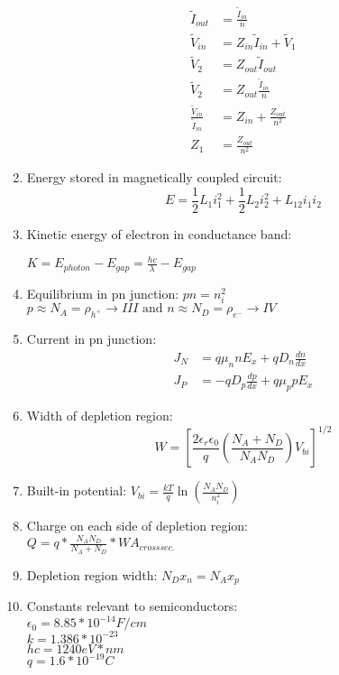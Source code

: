 \documentclass[twocolumn]{article}
\begin{document}
\begin{enumerate}
\begin{align*}
        \tilde{I}_{out} &= \frac{\tilde{I}_{in}}{n} \\
        \tilde{V}_{in} &= Z_{in}\tilde{I}_{in} + \tilde{V}_1 \\
        \tilde{V}_2 &= Z_{out}\tilde{I}_{out} \\
        \tilde{V}_2 &= Z_{out}\frac{\tilde{I}_{in}}{n} \\
        \frac{\tilde{V}_{in}}{\tilde{I}_{in}} &= Z_{in} + \frac{Z_{out}}{n^2}\\
        Z_{1}&=\frac{Z_{out}}{n^2}
    \end{align*}
    \item Energy stored in magnetically coupled circuit: 
    \[E = \frac{1}{2}L_1i_1^2 + \frac{1}{2}L_2i_2^2 + L_{12}i_1i_2\]
    \newpage
    \item Kinetic energy of electron in conductance band:
    \begin{center}
    $K=E_{photon}-E_{gap}=\frac{hc}{\lambda}-E_{gap}$
    \end{center}
    \item Equilibrium in pn junction: $pn = n_i^2$\\ \hspace{1cm}$p\approx N_A = \rho_{h^+}\rightarrow III \text{ and } n\approx N_D = \rho_{e^-} \rightarrow IV$
    \item Current in pn junction: 
    \begin{align*}
        J_N &= q\mu_n n E_x + qD_n \frac{dn}{dx} \\
        J_P &= -qD_p \frac{dp}{dx} + q\mu_p p E_x
    \end{align*}
    \item Width of depletion region: 
    \[W = \left[\frac{2\epsilon_r \epsilon_0}{q} \left(\frac{N_A + N_D}{N_A N_D}\right) V_{bi}\right]^{1/2}\]
    \item Built-in potential: $V_{bi} = \frac{kT}{q}\ln{\left(\frac{N_AN_D}{n_i^2}\right)}$
    \item Charge on each side of depletion region: \\$Q=q*\frac{N_A N_D}{N_A+N_D}*WA_{cross sec.}$
    \item Depletion region width: $N_Dx_n=N_Ax_p$
    \item Constants relevant to semiconductors: \\
    $\epsilon_0=8.85*10^{-14} F/cm$\\
    $k=1.386*10^{-23}$\\
    $hc=1240eV*nm$\\
    $q=1.6*10^{-19}C$\\

\end{enumerate}
\end{document}
